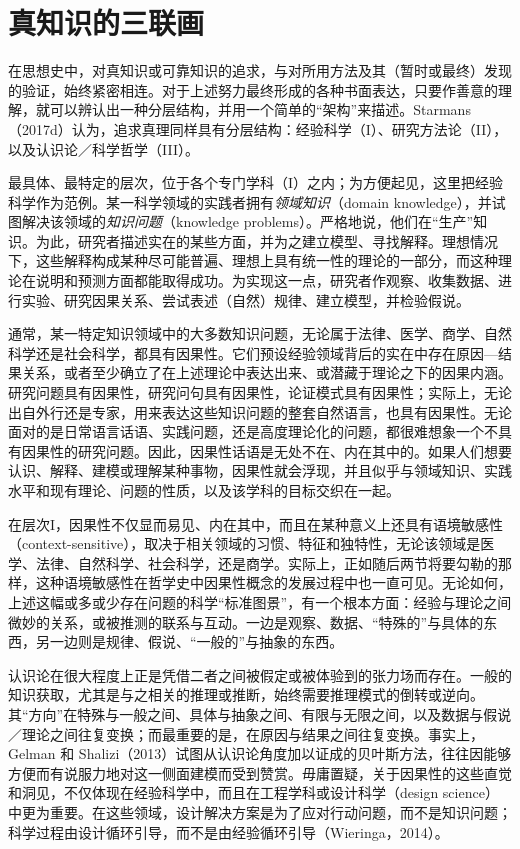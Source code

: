 \section{真知识的三联画}

在思想史中，对真知识或可靠知识的追求，与对所用方法及其（暂时或最终）发现的验证，始终紧密相连。对于上述努力最终形成的各种书面表达，只要作善意的理解，就可以辨认出一种分层结构，并用一个简单的“架构”来描述。Starmans（2017d）认为，追求真理同样具有分层结构：经验科学（I）、研究方法论（II），以及认识论／科学哲学（III）。

最具体、最特定的层次，位于各个专门学科（I）之内；为方便起见，这里把经验科学作为范例。某一科学领域的实践者拥有\emph{领域知识}（domain knowledge），并试图解决该领域的\emph{知识问题}（knowledge problems）。严格地说，他们在“生产”知识。为此，研究者描述实在的某些方面，并为之建立模型、寻找解释。理想情况下，这些解释构成某种尽可能普遍、理想上具有统一性的理论的一部分，而这种理论在说明和预测方面都能取得成功。为实现这一点，研究者作观察、收集数据、进行实验、研究因果关系、尝试表述（自然）规律、建立模型，并检验假说。

通常，某一特定知识领域中的大多数知识问题，无论属于法律、医学、商学、自然科学还是社会科学，都具有因果性。它们预设经验领域背后的实在中存在原因—结果关系，或者至少确立了在上述理论中表达出来、或潜藏于理论之下的因果内涵。研究问题具有因果性，研究问句具有因果性，论证模式具有因果性；实际上，无论出自外行还是专家，用来表达这些知识问题的整套自然语言，也具有因果性。无论面对的是日常语言话语、实践问题，还是高度理论化的问题，都很难想象一个不具有因果性的研究问题。因此，因果性话语是无处不在、内在其中的。如果人们想要认识、解释、建模或理解某种事物，因果性就会浮现，并且似乎与领域知识、实践水平和现有理论、问题的性质，以及该学科的目标交织在一起。

在层次I，因果性不仅显而易见、内在其中，而且在某种意义上还具有语境敏感性（context-sensitive），取决于相关领域的习惯、特征和独特性，无论该领域是医学、法律、自然科学、社会科学，还是商学。实际上，正如随后两节将要勾勒的那样，这种语境敏感性在哲学史中因果性概念的发展过程中也一直可见。无论如何，上述这幅或多或少存在问题的科学“标准图景”，有一个根本方面：经验与理论之间微妙的关系，或被推测的联系与互动。一边是观察、数据、“特殊的”与具体的东西，另一边则是规律、假说、“一般的”与抽象的东西。

认识论在很大程度上正是凭借二者之间被假定或被体验到的张力场而存在。一般的知识获取，尤其是与之相关的推理或推断，始终需要推理模式的倒转或逆向。其“方向”在特殊与一般之间、具体与抽象之间、有限与无限之间，以及数据与假说／理论之间往复变换；而最重要的是，在原因与结果之间往复变换。事实上，Gelman 和 Shalizi（2013）试图从认识论角度加以证成的贝叶斯方法，往往因能够方便而有说服力地对这一侧面建模而受到赞赏。毋庸置疑，关于因果性的这些直觉和洞见，不仅体现在经验科学中，而且在工程学科或设计科学（design science）中更为重要。在这些领域，设计解决方案是为了应对行动问题，而不是知识问题；科学过程由设计循环引导，而不是由经验循环引导（Wieringa，2014）。

